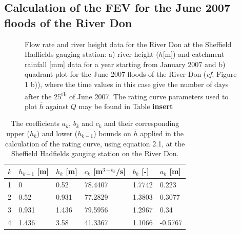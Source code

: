 \documentclass[11pt,a4paper]{article}
\begin{document}
\subsection{Calculation of the FEV for the June 2007 floods of the River Don}
\begin{figure}[H]
\centering
{}
\hfill
{}
\caption{Flow rate and river height data for the River Don at the Sheffield Hadfields gauging station: a) river height ($\overline{h}$[m]) \cite{Calder-Don} and catchment rainfall [mm] data \cite{NRFA} for a year starting from January 2007 and b) quadrant plot for the June 2007 floods of the River Don (\textit{cf.} Figure 1 b)), where the time values in this case give the number of days after the 25\textsuperscript{th} of June 2007. The rating curve parameters used to plot $\overline{h}$ against $Q$ may be found in Table \textbf{insert}}
\end{figure}

\begin{table}[H]
\centering
\begin{tabular}{l|l|l|l|l|l}
$k$ & $h_{k-1}$ [m] & $h_k$ [m] & $c_k$ [m$^{3-b_k}$/s] & $b_k$ [-] & $a_k$ [m]\\
\hline
1 & 0 & 0.52 & 78.4407 & 1.7742 & 0.223 \\
2 & 0.52 & 0.931 & 77.2829 & 1.3803 & 0.3077 \\
3 & 0.931 & 1.436 & 79.5956 & 1.2967 & 0.34 \\
4 & 1.436 & 3.58 & 41.3367 & 1.1066 & -0.5767 \\
\end{tabular}
\caption{The coefficients $a_k$, $b_k$ and $c_k$ and their corresponding upper ($h_k$) and lower ($h_{k-1}$) bounds on $\overline{h}$ \cite{Calder-Don} applied in the calculation of the rating curve, using equation 2.1, at the Sheffield Hadfields gauging station on the River Don.}
\end{table}
\end{document}

